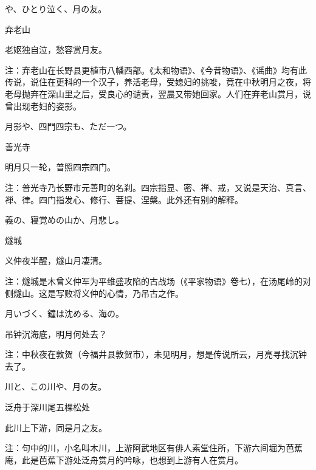 \begin{haiku}
    {\FH {}や、ひとり泣く、月の友。}

    {\FK 弃老山}

    {\FK 老妪独自泣，愁容赏月友。}

    {\FT 注：弃老山在长野县更植市八幡西部。《太和物语》、《今昔物语》、《谣曲》均有此传说，说住在更科的一个汉子，养活老母，受媳妇的挑唆，竟在中秋明月之夜，将老母抛弃在深山里之后，受良心的谴责，翌晨又带她回家。人们在弃老山赏月，说曾出现老妇的姿影。}
\end{haiku}

\begin{haiku}
    {\FH 月影や、四門四宗も、ただ一つ。}

    {\FK 善光寺}

    {\FK 明月只一轮，普照四宗四门。}

    {\FT 注：普光寺乃长野市元善町的名刹。四宗指显、密、禅、戒，又说是天治、真言、禅、律。四门指发心、修行、菩提、涅槃。此外还有别的解释。}
\end{haiku}

\begin{haiku}
    {\FH 義の、寝覚めの山か、月悲し。}

    {\FK 燧城}

    {\FK 义仲夜半醒，燧山月凄清。}

    {\FT 注：燧城是木曾义仲军为平维盛攻陷的古战场（《平家物语》卷七），在汤尾岭的对侧燧山。这是写败将义仲的心情，乃吊古之作。}
\end{haiku}

\begin{haiku}
    {\FH 月いづく、鐘は沈める、海の。}

    {\FK 吊钟沉海底，明月何处去？}

    {\FT 注：中秋夜在敦贺（今福井县敦贺市），未见明月，想是传说所云，月亮寻找沉钟去了。}
\end{haiku}

\begin{haiku}
    {\FH 川と、この川や、月の友。}

    {\FK 泛舟于深川尾五棵松处}

    {\FK 此川上下游，同是月之友。}

    {\FT 注：句中的川，小名叫木川，上游阿武地区有俳人素堂住所，下游六间堀为芭蕉庵，此是芭蕉下游处泛舟赏月的吟咏，也想到上游有人在赏月。}
\end{haiku}

